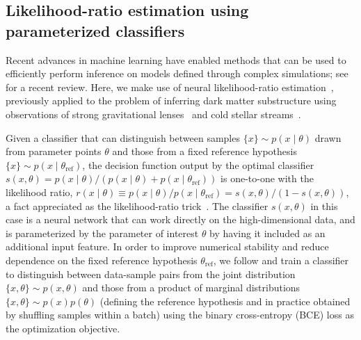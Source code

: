 \documentclass[twocolumn,linenumbers,anonymous]{aastex631}
\begin{document}
\subsection{Likelihood-ratio estimation using parameterized classifiers} 

Recent advances in machine learning have enabled methods that can be used to efficiently perform inference on models defined through complex simulations; see \citet{Cranmer:2019eaq} for a recent review. Here, we make use of neural likelihood-ratio estimation~\citep{Cranmer:2015bka,Baldi:2016fzo,Brehmer:2018eca,Brehmer:2018hga,Brehmer:2018kdj,Hermans:2019ioj}, previously applied to the problem of inferring dark matter substructure using observations of strong gravitational lenses~\citep{Brehmer:2019jyt} and cold stellar streams~\citep{Hermans:2020skz}. 

Given a classifier that can distinguish between samples $\{x\} \sim p(x\mid\theta)$ drawn from parameter points $\theta$ and those from a fixed reference hypothesis $\{x\} \sim p(x\mid\theta_\mathrm{ref})$, the decision function output by the optimal classifier $s(x, \theta) = {p(x\mid\theta)}/{\left(p(x\mid\theta) + p(x\mid\theta_\mathrm{ref})\right)}$ is one-to-one with the likelihood ratio, $r(x\mid \theta) \equiv {p(x\mid\theta)}/{p(x\mid\theta_\mathrm{ref})}  = {s(x, \theta)}/{\left(1 - s(x, \theta)\right)}$, a fact appreciated as the likelihood-ratio trick~\citep{Cranmer:2015bka,mohamed2017learning}. 
The classifier $s(x, \theta)$ in this case is a neural network that can work directly on the high-dimensional data, and is parameterized by the parameter of interest $\theta$ by having it included as an additional input feature. In order to improve numerical stability and reduce dependence on the fixed reference hypothesis $\theta_\mathrm{ref}$, we follow \citet{Hermans:2019ioj} and train a classifier to distinguish between data-sample pairs from the joint distribution $\{x, \theta\} \sim p(x,\theta)$ and those from a product of marginal distributions $\{x, \theta\} \sim p(x)p(\theta)$ (defining the reference hypothesis and in practice obtained by shuffling samples within a batch) using the binary cross-entropy (BCE) loss as the optimization objective. 
\end{document}
